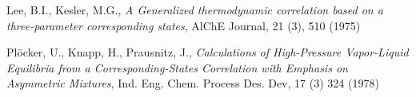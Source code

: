 \documentclass[internal,english]{sintefmemo2012}
\numberwithin{equation}{section}
\begin{document}
\begin{thebibliography}{9}
  
	Lee, B.I., Kesler, M.G., \textit{A Generalized thermodynamic correlation based on a three-parameter corresponding states}, AlChE Journal, 21 (3), 510 (1975)

	Plöcker, U., Knapp, H., Prausnitz, J., \textit{Calculations of High-Pressure Vapor-Liquid Equilibria from a Corresponding-States Correlation with Emphasis on Asymmetric Mixtures}, Ind. Eng. Chem. Process Des. Dev, 17 (3) 324 (1978)
	

\end{thebibliography}
\end{document}
